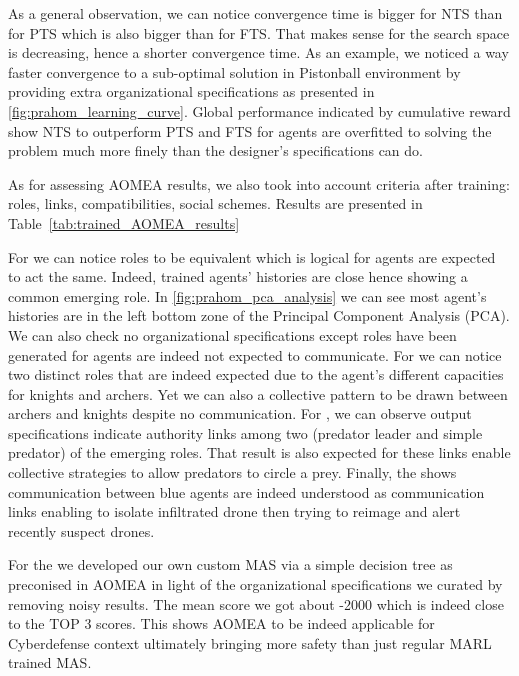 \documentclass[runningheads]{llncs}
\begin{document}
As a general observation, we can notice convergence time is bigger for NTS than for PTS which is also bigger than for FTS. That makes sense for the search space is decreasing, hence a shorter convergence time. As an example, we noticed a way faster convergence to a sub-optimal solution in Pistonball environment by providing extra organizational specifications as presented in \autoref{fig:prahom_learning_curve}. Global performance indicated by cumulative reward show NTS to outperform PTS and FTS for agents are overfitted to solving the problem much more finely than the designer's specifications can do.

As for assessing AOMEA results, we also took into account criteria after training: roles, links, compatibilities, social schemes. Results are presented in Table~\ref{tab:trained_AOMEA_results}




For  we can notice roles to be equivalent which is logical for agents are expected to act the same. Indeed, trained agents' histories are close hence showing a common emerging role. In \autoref{fig:prahom_pca_analysis} we can see most agent's histories are in the left bottom zone of the Principal Component Analysis (PCA). We can also check no organizational specifications except roles have been generated for agents are indeed not expected to communicate. For  we can notice two distinct roles that are indeed expected due to the agent's different capacities for knights and archers. Yet we can also a collective pattern to be drawn between archers and knights despite no communication. For , we can observe output specifications indicate authority links among two (predator leader and simple predator) of the emerging roles. That result is also expected for these links enable collective strategies to allow predators to circle a prey. Finally, the  shows communication between blue agents are indeed understood as communication links enabling to isolate infiltrated drone then trying to reimage and alert recently suspect drones.

For the  we developed our own custom MAS via a simple decision tree as preconised in AOMEA in light of the organizational specifications we curated by removing noisy results. The mean score we got about -2000 which is indeed close to the TOP 3 scores. This shows AOMEA to be indeed applicable for Cyberdefense context ultimately bringing more safety than just regular MARL trained MAS.
\end{document}
